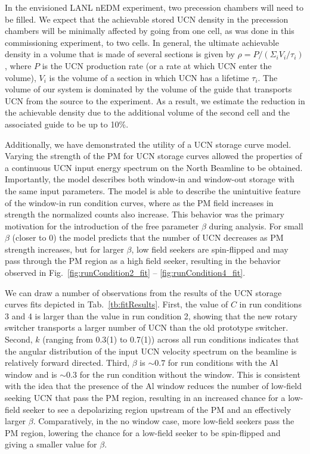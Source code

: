 In the envisioned LANL nEDM experiment, two precession chambers will need to be filled. We expect that the achievable stored UCN density in the precession chambers will be minimally affected by going from one cell, as was done in this commissioning experiment, to two cells. In general, the ultimate achievable density in a volume that is made of several sections is given by $\rho = P/(\Sigma_i V_i/\tau_i)$, where $P$ is the UCN production rate (or a rate at which UCN enter the volume), $V_i$ is the volume of a section in which UCN has a lifetime $\tau_i$.  The volume of our system is dominated by the volume of the guide that transports UCN from the source to the experiment. As a result, we estimate the reduction in the achievable density due to the additional volume of the second cell and the associated guide to be up to 10\%. 

Additionally, we have demonstrated the utility of a UCN storage curve model. Varying the strength of the PM for UCN storage curves allowed the properties of a continuous UCN input energy spectrum on the North Beamline to be obtained. Importantly, the model describes both window-in and window-out storage with the same input parameters. The model is able to describe the unintuitive feature of the window-in run condition curves, where as the PM field increases in strength the normalized counts also increase. This behavior was the primary motivation for the introduction of the free parameter $\beta$ during analysis. For small $\beta$ (closer to 0) the model predicts that the number of UCN decreases as PM strength increases, but for larger $\beta$, low field seekers are spin-flipped and may pass through the PM region as a high field seeker, resulting in the behavior observed in Fig.~\ref{fig:runCondition2_fit} -- \ref{fig:runCondition4_fit}.

We can draw a number of observations from the results of the UCN storage curves fits depicted in Tab.~\ref{tb:fitResults}. First, the value of $C$ in run conditions 3 and 4 is larger than the value in run condition 2, showing that the new rotary switcher transports a larger number of UCN than the old prototype switcher. Second, $k$ (ranging from 0.3(1) to 0.7(1)) across all run conditions indicates that the angular distribution of the input UCN velocity spectrum on the beamline is relatively forward directed. Third, $\beta$ is $\sim 0.7$ for run conditions with the Al window and is $\sim 0.3$ for the run condition without the window. This is consistent with the idea that the presence of the Al window reduces the number of low-field seeking UCN that pass the PM region, resulting in an increased chance for a low-field seeker to see a depolarizing region upstream of the PM and an effectively larger $\beta$. Comparatively, in the no window case, more low-field seekers pass the PM region, lowering the chance for a low-field seeker to be spin-flipped and giving a smaller value for $\beta$. 

